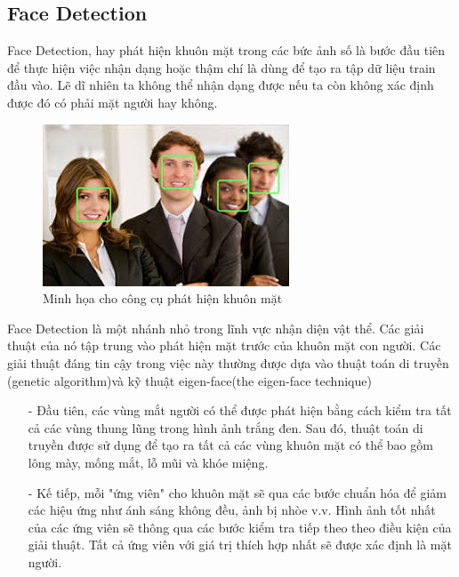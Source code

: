 \documentclass[a4paper]{report}
\begin{document}
\subsection{Face Detection}
Face Detection, hay phát hiện khuôn mặt trong các bức ảnh số là bước đầu tiên để thực hiện việc nhận dạng hoặc thậm chí là dùng để tạo ra tập dữ liệu train đầu vào. Lẽ dĩ nhiên ta không thể nhận dạng được nếu ta còn không xác định được đó có phải mặt người hay không. 
%
\begin{figure}[H]
\centering
\includegraphics[scale=.5]{../images/fig/fdetect.jpg}
\caption{Minh họa cho công cụ phát hiện khuôn mặt}
\label{fig:imgpro}
\end{figure}
%
\noindent
Face Detection là một nhánh nhỏ trong lĩnh vực nhận diện vật thể. Các giải thuật của nó tập trung vào phát hiện mặt trước của khuôn mặt con người. Các giải thuật đáng tin cậy trong việc này thường được dựa vào thuật toán di truyền (genetic algorithm)và kỹ thuật eigen-face\cite{genetic}(the eigen-face technique)\cite{eigen}
\begin{itemize}
\item[-] Đầu tiên, các vùng mắt người có thể được phát hiện bằng cách kiểm tra tất cả các vùng thung lũng trong hình ảnh trắng đen. Sau đó, thuật toán di truyền được sử dụng để tạo ra tất cả các vùng khuôn mặt có thể bao gồm lông mày, mống mắt, lỗ mũi và khóe miệng.
\item[-]  Kế tiếp, mỗi "ứng viên" cho khuôn mặt sẽ qua các bước chuẩn hóa để giảm các hiệu ứng như ánh sáng không đều, ảnh bị nhòe v.v. Hình ảnh tốt nhất của các ứng viên sẽ thông qua các bước kiểm tra tiếp theo theo điều kiện của giải thuật. Tất cả ứng viên với giá trị thích hợp nhất sẽ được xác định là mặt người.
\end{itemize}
%
\end{document}
